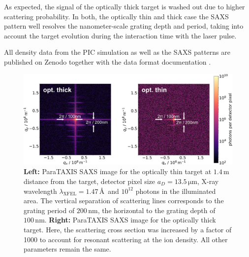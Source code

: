 As expected, the signal of the optically thick target is washed out due to
higher scattering probability. In both, the optically thin and thick case the
SAXS pattern well resolves the nanometer-scale grating depth and period, taking
into account the target evolution during the interaction time with the laser
pulse.

All density data from the PIC simulation as well as the SAXS patterns are
published on Zenodo together with the data format documentation
\cite{Garten2017.zenodo.885033}.

\begin{figure}
\centering
  \includegraphics[width=.99\linewidth]{figures/scattering_images_v2.png}
\caption{
\textbf{Left:} ParaTAXIS SAXS image for the optically thin target at
$1.4\,\mathrm{m}$ distance from the target, detector pixel size $a_D =
13.5\,\mathrm{\mu m}$, X-ray wavelength $\lambda_\mathrm{XFEL} = 1.47\,$\AA\ and
$10^{12}$ photons in the illuminated area. The vertical separation of scattering
lines corresponds to the grating period of $200\,\mathrm{nm}$, the horizontal to
the grating depth of $100\,\mathrm{nm}$.
\textbf{Right:} ParaTAXIS SAXS image for the optically thick target. Here, the
scattering cross section was increased by a factor of 1000 to account for
resonant scattering at the ion density. All other parameters remain the same.  }
  \label{fig:scattering}
\end{figure}



